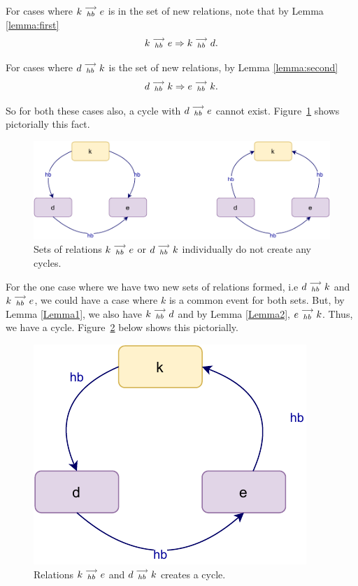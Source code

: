    For cases where $k\stackrel{\longrightarrow}{_{hb}}e$ is in the set of new relations, note that by Lemma \ref{lemma:first}
    \[
        k\stackrel{\longrightarrow}{_{hb}}e \Rightarrow k\stackrel{\longrightarrow}{_{hb}}d.
    \]

    For cases where $d\stackrel{\longrightarrow}{_{hb}}k$ is the set of new relations, by Lemma \ref{lemma:second}
    \[
        d\stackrel{\longrightarrow}{_{hb}}k \Rightarrow e\stackrel{\longrightarrow}{_{hb}}k.
    \]

    So for both these cases also, a cycle with $d\stackrel{\longrightarrow}{_{hb}}e$ cannot exist. 
    Figure~\ref{reord:cycle(b)} shows pictorially this fact. 
    \begin{figure}[H]
        \centering
        \includegraphics[scale=0.7]{4.InstructionReordering/4.ValidReorderingCandidate/ProofParts/Part3/part3(c).pdf}
        \caption{Sets of relations $k\stackrel{\longrightarrow}{_{hb}}e$ or $d\stackrel{\longrightarrow}{_{hb}}k$ individually do not create any cycles.}
        \label{reord:cycle(b)}
    \end{figure}

    For the one case where we have two new sets of relations formed, i.e $d\stackrel{\longrightarrow}{_{hb}}k$ and $k\stackrel{\longrightarrow}{_{hb}}e$, we could have a case where $k$ is a common event for both sets. 
    But, by Lemma \ref{Lemma1}, we also have $k\stackrel{\longrightarrow}{_{hb}}d$ and by Lemma \ref{Lemma2}, $e\stackrel{\longrightarrow}{_{hb}}k$. 
    Thus, we have a cycle. 
    Figure~\ref{reord:cycle(c)} below shows this pictorially.
    \begin{figure}[H]
        \centering
        \includegraphics[scale=0.7]{4.InstructionReordering/4.ValidReorderingCandidate/ProofParts/Part3/part3(d).pdf}
        \caption{Relations $k\stackrel{\longrightarrow}{_{hb}}e$ and $d\stackrel{\longrightarrow}{_{hb}}k$ creates a cycle.}
        \label{reord:cycle(c)}
    \end{figure}

